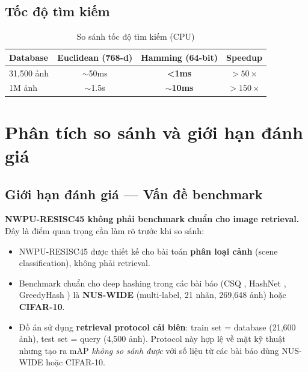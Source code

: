 \documentclass[13pt,a4paper]{article}
\begin{document}
\subsection{Tốc độ tìm kiếm}

\begin{table}[H]
\centering
\caption{So sánh tốc độ tìm kiếm (CPU)}
\label{tab:search_speed}
\begin{tabular}{lccc}
\toprule
\textbf{Database} & \textbf{Euclidean (768-d)} & \textbf{Hamming (64-bit)} & \textbf{Speedup} \\
\midrule
31{,}500 ảnh  & $\sim$50ms  & \textbf{<1ms}   & $>50\times$ \\
1M ảnh        & $\sim$1.5s  & \textbf{$\sim$10ms} & $>150\times$ \\
\bottomrule
\end{tabular}
\end{table}


\section{Phân tích so sánh và giới hạn đánh giá}

\subsection{Giới hạn đánh giá --- Vấn đề benchmark}

\textbf{NWPU-RESISC45 không phải benchmark chuẩn cho image retrieval.} Đây là điểm quan trọng cần làm rõ trước khi so sánh:

\begin{itemize}
    \item NWPU-RESISC45 được thiết kế cho bài toán \textbf{phân loại cảnh} (scene classification), không phải retrieval.
    \item Benchmark chuẩn cho deep hashing trong các bài báo (CSQ \cite{yuan2020csq}, HashNet \cite{cao2017hashnet}, GreedyHash \cite{su2018greedy}) là \textbf{NUS-WIDE} (multi-label, 21 nhãn, 269{,}648 ảnh) hoặc \textbf{CIFAR-10}.
    \item Đồ án sử dụng \textbf{retrieval protocol cải biên}: train set = database (21{,}600 ảnh), test set = query (4{,}500 ảnh). Protocol này hợp lệ về mặt kỹ thuật nhưng tạo ra mAP \textit{không so sánh được} với số liệu từ các bài báo dùng NUS-WIDE hoặc CIFAR-10.
\end{itemize}
\end{document}
